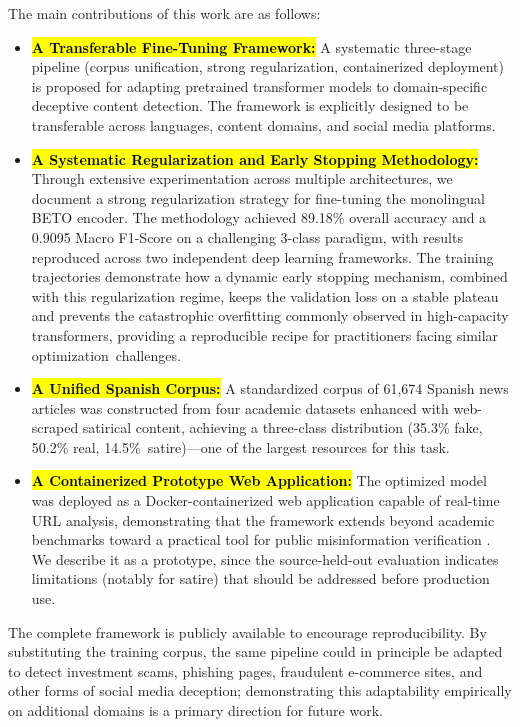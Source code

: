 \documentclass[informatics,article,accept,pdftex,moreauthors]{Definitions/mdpi}
\begin{document}
The main contributions of this work are as follows:
\begin{itemize}
    \item \textbf{\hl{A Transferable Fine-Tuning Framework:}} A systematic three-stage pipeline (corpus unification, strong regularization, containerized deployment) is proposed for adapting pretrained transformer models to domain-specific deceptive content detection. The framework is explicitly designed to be transferable across languages, content domains, and social media platforms.
    \item \textbf{\hl{A Systematic Regularization and Early Stopping Methodology:}} Through extensive experimentation across multiple architectures, we document a strong regularization strategy for fine-tuning the monolingual BETO encoder. The methodology achieved 89.18\% overall accuracy and a 0.9095 Macro F1-Score on a challenging 3-class paradigm, with results reproduced across two independent deep learning frameworks. The training trajectories demonstrate how a dynamic early stopping mechanism, combined with this regularization regime, keeps the validation loss on a stable plateau and prevents the catastrophic overfitting commonly observed in high-capacity transformers, providing a reproducible recipe for practitioners facing similar \mbox{optimization challenges}.
    \item \textbf{\hl{A Unified Spanish Corpus:}} A standardized corpus of 61,674 Spanish news articles was constructed from four academic datasets \citep{posadas2019detection, acosta2019construccion, tretiakov2022detection, blanco2024enhancing} enhanced with web-scraped satirical content, achieving a three-class distribution (35.3\% fake, 50.2\% real, \mbox{14.5\% satire})—one of the largest resources for this task.
    \item \textbf{\hl{A Containerized Prototype Web Application:}} The optimized model was deployed as a Docker-containerized web application capable of real-time URL analysis, demonstrating that the framework extends beyond academic benchmarks toward a practical tool for public misinformation verification \citep{ali2022fake}. We describe it as a prototype, since the source-held-out evaluation indicates limitations (notably for satire) that should be addressed before production use.
\end{itemize}

The complete framework is publicly available to encourage reproducibility. By substituting the training corpus, the same pipeline could in principle be adapted to detect investment scams, phishing pages, fraudulent e-commerce sites, and other forms of social media deception; demonstrating this adaptability empirically on additional domains is a primary direction for future work.
\end{document}
